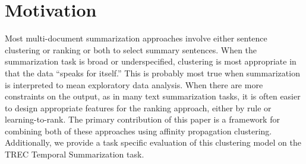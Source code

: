 \section{Motivation}

Most multi-document summarization approaches involve either sentence 
clustering or ranking or both to select summary sentences.
When the summarization task
is broad or underspecified, clustering is most appropriate in that the data
``speaks for itself.'' This is probably most true when summarization is 
interpreted to mean exploratory data analysis. 
When there are more constraints on the output, as in many text summarization
tasks,
it is often easier to design appropriate features for the ranking approach, 
either by rule or learning-to-rank. The primary contribution of this paper
is a framework for combining both of these approaches using affinity
propagation clustering. Additionally, we provide a task specific evaluation
of this clustering model on the TREC Temporal Summarization task. 





